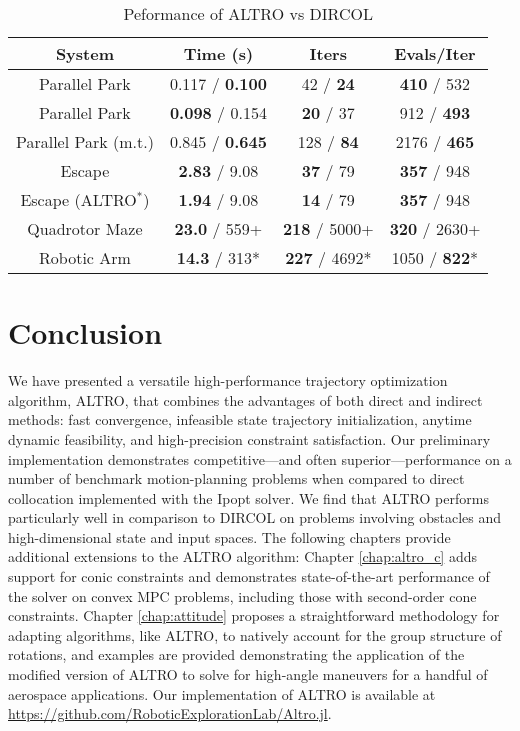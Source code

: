 \documentclass[../root.tex]{subfiles}
\begin{document}
\begin{table}
    \caption{Peformance of ALTRO vs DIRCOL}
    \begin{center}
        \begin{tabular}{|c||c|c|c|}
            \hline
            System & Time (s) & Iters & Evals/Iter \\
            \hline
            \hline
            Parallel Park & 0.117 /\textbf{ 0.100} & 42 / \textbf{24} & \textbf{410} / 532 \\ \hline
            Parallel Park & \textbf{0.098} / 0.154 & \textbf{20} / 37 & 912 / \textbf{493} \\ \hline
            Parallel Park (m.t.) & 0.845 / \textbf{0.645} & 128 / \textbf{84} & 2176 / \textbf{465} \\ \hline
            Escape & \textbf{2.83} / 9.08  & \textbf{37} / 79 & \textbf{357} / 948 \\ \hline
            Escape (ALTRO$^*$) & \textbf{1.94} / 9.08  & \textbf{14} / 79 & \textbf{357} / 948 \\ \hline
            Quadrotor Maze & \textbf{23.0} / 559+ & \textbf{218} / 5000+ & \textbf{320} / 2630+ \\ \hline
            Robotic Arm & \textbf{14.3} / 313* & \textbf{227} / 4692* & 1050 / \textbf{822}* \\ \hline
        \end{tabular}
    \end{center}
    \label{table_performance}
\end{table}

\section{Conclusion}
We have presented a versatile high-performance trajectory optimization
algorithm, ALTRO, that combines the advantages of both direct and indirect
methods: fast convergence, infeasible state trajectory initialization,
anytime dynamic feasibility, and high-precision constraint satisfaction. Our
preliminary implementation demonstrates competitive---and often
superior---performance on a number of benchmark motion-planning problems when
compared to direct collocation implemented with the Ipopt solver. We find
that ALTRO performs particularly well in comparison to DIRCOL on problems
involving obstacles and high-dimensional state and input spaces. 
The following chapters provide additional extensions to the ALTRO algorithm: 
Chapter \ref{chap:altro_c} adds support for conic constraints and demonstrates 
state-of-the-art performance of the solver on convex MPC problems, including those 
with second-order cone constraints. Chapter \ref{chap:attitude} proposes a straightforward
methodology for adapting algorithms, like ALTRO, to natively account for the group structure
of rotations, and examples are provided demonstrating the application of the modified 
version of ALTRO to solve for high-angle maneuvers for a handful of aerospace applications.
Our implementation of ALTRO is available at
{\footnotesize
\url{https://github.com/RoboticExplorationLab/Altro.jl}}.
\end{document}
